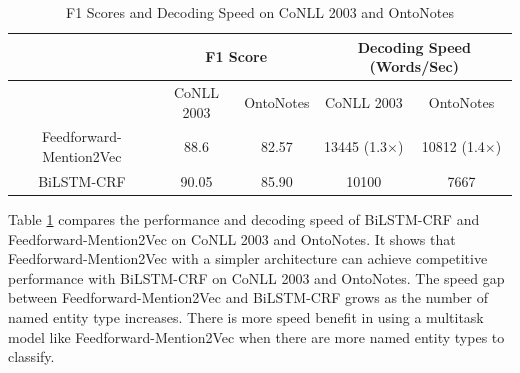 \begin{table}[h]
\centering
\caption{F1 Scores and Decoding Speed on CoNLL 2003 and OntoNotes }
\label{table:my-label3}
\begin{tabular}{|c|c|c|c|c|}
\hline
& \multicolumn{2}{c|}{F1 Score} & \multicolumn{2}{c|}{Decoding Speed (Words/Sec)} \\ \hline
& CoNLL 2003     & OntoNotes    & CoNLL 2003              & OntoNotes             \\ \hline
Feedforward-Mention2Vec & 88.6          & 82.57        & 13445 (1.3$\times$)                  & 10812 (1.4$\times$)               \\ \hline
BiLSTM-CRF         & 90.05          & 85.90        & 10100                   & 7667                  \\ \hline
\end{tabular}
\end{table}

Table \ref{table:my-label3} compares the performance and decoding speed of BiLSTM-CRF and Feedforward-Mention2Vec on CoNLL 2003 and OntoNotes. It shows that Feedforward-Mention2Vec with a simpler architecture can achieve competitive performance with BiLSTM-CRF on CoNLL 2003 and OntoNotes. The speed gap between Feedforward-Mention2Vec and BiLSTM-CRF grows as the number of named entity type increases. There is more speed benefit in using a multitask model like Feedforward-Mention2Vec when there are more named entity types to classify. 



